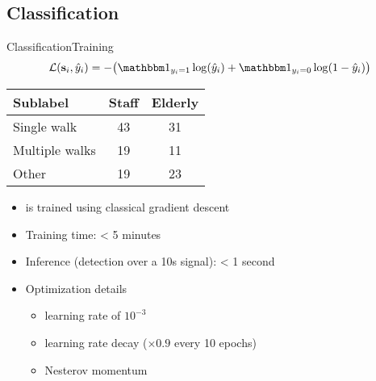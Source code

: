 

\subsection{Classification}

\begin{frame}{Classification}{Training}
\begin{equation*}\label{eq: loss training algp}
    \mathcal{L}(\bfs_i, \hat{y}_i) = - \big( \bbmind_{{y_i =1}} \log( \hat{y}_i ) + \bbmind_{ y_i=0 } \log(1- \hat{y}_i) \big)
\end{equation*}

\begin{table}[h]
    \centering 
    \begin{tabular}{lcc}
    \toprule
    \textbf{Sublabel} & \textbf{Staff} & \textbf{Elderly} \\
    \midrule
    Single walk & 43 & 31 \\
    Multiple walks & 19 & 11 \\
    Other & 19 & 23 \\
    \bottomrule
    \end{tabular}
\end{table}
    \begin{itemize}
        \item \subalgo is trained using classical gradient descent
        \item Training time: < 5 minutes
        \item Inference (detection over a 10s signal): < 1 second
        \item Optimization details
        \begin{itemize}
            \item learning rate of $10^{-3}$
            \item learning rate decay ($\times 0.9$ every 10 epochs)
            \item Nesterov momentum
        \end{itemize}
    \end{itemize}

\end{frame}


